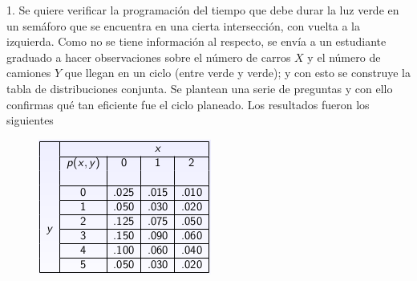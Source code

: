\documentclass[11pt,letterpaper]{article}
\begin{document}
1. Se quiere verificar la programación del tiempo que debe durar la luz verde en un semáforo que se encuentra en una cierta intersección, con vuelta a la izquierda. Como no se tiene información al respecto, se envía a un estudiante graduado a hacer observaciones sobre el número de carros $X$
y el número de camiones $Y$ que llegan en un ciclo (entre verde y verde); y con esto se construye la tabla de distribuciones conjunta. Se plantean una serie de preguntas y con ello confirmas qué tan eficiente fue el ciclo planeado. Los resultados fueron los siguientes
\begin{figure}[H]
\centering
\includegraphics[scale=1]{semaforo.png}
\end{figure}
\end{document}
